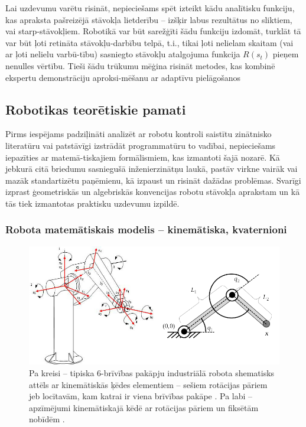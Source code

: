 \documentclass[12pt, a4paper]{article}
\numberwithin{equation}{section} %
\begin{document}
Lai uzdevumu varētu risināt, nepieciešams spēt izteikt kādu analītisku funkciju, kas apraksta pašreizējā stāvokļa lietderību -- izšķir labus rezultātus no sliktiem, vai starp-stāvokļiem. Robotikā var būt sarežģīti šādu funkciju izdomāt, turklāt tā var būt ļoti retināta stāvokļu-darbību telpā, t.i., tikai ļoti nelielam skaitam (vai ar ļoti nelielu varbū-tību) sasniegto stāvokļu atalgojuma funkcija $R(s_t)$ pieņem nenulles vērtību. Tieši šādu trūkumu mēģina risināt metodes, kas kombinē ekspertu demonstrāciju aproksi-mēšanu ar adaptīvu pielāgošanos \cite{nair2018overcoming}


\subsection{Robotikas teorētiskie pamati}

Pirms iespējams padziļināti analizēt ar robotu kontroli saistītu zinātnisko literatūru vai patstāvīgi izstrādāt programmatūru to vadībai, nepieciešams iepazīties ar matemā-tiskajiem formālismiem, kas izmantoti šajā nozarē. Kā jebkurā citā briedumu sasniegušā inženierzinātņu laukā, pastāv virkne vairāk vai mazāk standartizētu paņēmienu, kā izpaust un risināt dažādas problēmas. Svarīgi izprast ģeometriskās un algebriskās konvencijas robotu stāvokļa aprakstam un kā tās tiek izmantotas praktisku uzdevumu izpildē.

\subsubsection{Robota matemātiskais modelis -- kinemātiska, kvaternioni}


\begin{figure}[t!]
    \centering
    \includegraphics[width=16cm,page=1]{../img/6dof-kinematics.png}
    \caption{Pa kreisi -- tipiska 6-brīvības pakāpju industriālā robota shematisks attēls ar kinemātiskās ķēdes elementiem -- sešiem rotācijas pāriem jeb locītavām, kam katrai ir viena brīvības pakāpe \cite{harib2012parallel}. Pa labi -- apzīmējumi kinemātiskajā kēdē ar rotācijas pāriem un fiksētām nobīdēm \cite{kinematics_illinois}.}
\end{figure}
\end{document}

